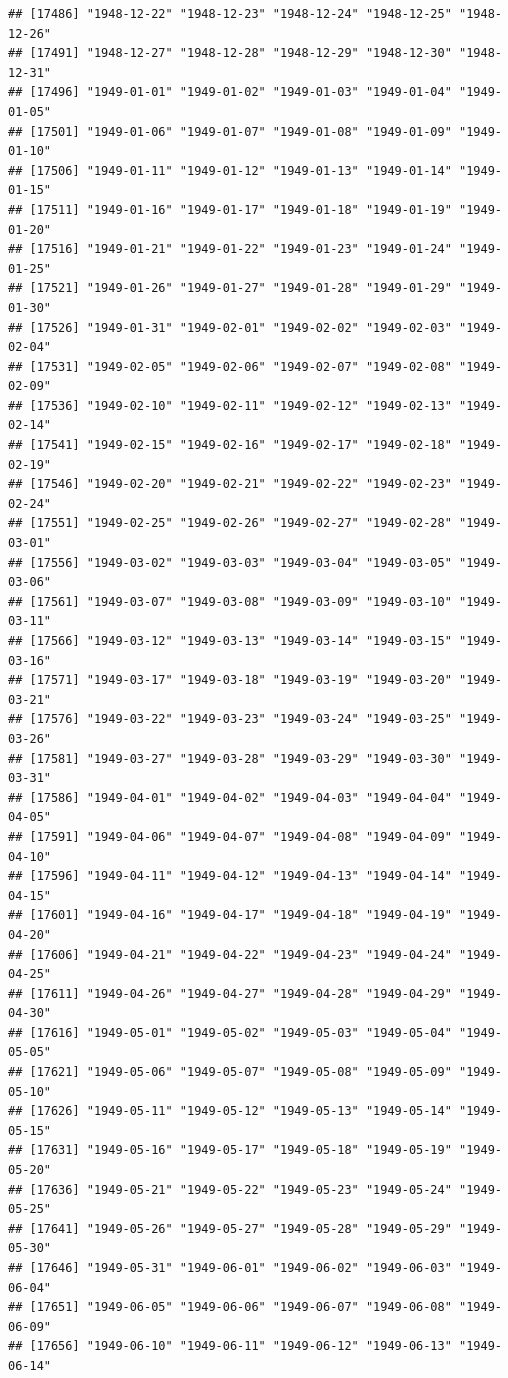 \documentclass{article}\usepackage[]{graphicx}\usepackage[]{color}
\makeatletter
\newenvironment{kframe}{%
 \def\at@end@of@kframe{}%
 \ifinner\ifhmode%
  \def\at@end@of@kframe{\end{minipage}}%
  \begin{minipage}{\columnwidth}%
 \fi\fi%
 \def\FrameCommand##1{\hskip\@totalleftmargin \hskip-\fboxsep
 \colorbox{shadecolor}{##1}\hskip-\fboxsep
     \hskip-\linewidth \hskip-\@totalleftmargin \hskip\columnwidth}%
 \MakeFramed {\advance\hsize-\width
   \@totalleftmargin\z@ \linewidth\hsize
   \@setminipage}}%
 {\par\unskip\endMakeFramed%
 \at@end@of@kframe}
\newenvironment{knitrout}{}{} %
\makeatother
\begin{document}
\begin{description}
\begin{knitrout}
\begin{kframe}
\begin{verbatim}
## [17486] "1948-12-22" "1948-12-23" "1948-12-24" "1948-12-25" "1948-12-26"
## [17491] "1948-12-27" "1948-12-28" "1948-12-29" "1948-12-30" "1948-12-31"
## [17496] "1949-01-01" "1949-01-02" "1949-01-03" "1949-01-04" "1949-01-05"
## [17501] "1949-01-06" "1949-01-07" "1949-01-08" "1949-01-09" "1949-01-10"
## [17506] "1949-01-11" "1949-01-12" "1949-01-13" "1949-01-14" "1949-01-15"
## [17511] "1949-01-16" "1949-01-17" "1949-01-18" "1949-01-19" "1949-01-20"
## [17516] "1949-01-21" "1949-01-22" "1949-01-23" "1949-01-24" "1949-01-25"
## [17521] "1949-01-26" "1949-01-27" "1949-01-28" "1949-01-29" "1949-01-30"
## [17526] "1949-01-31" "1949-02-01" "1949-02-02" "1949-02-03" "1949-02-04"
## [17531] "1949-02-05" "1949-02-06" "1949-02-07" "1949-02-08" "1949-02-09"
## [17536] "1949-02-10" "1949-02-11" "1949-02-12" "1949-02-13" "1949-02-14"
## [17541] "1949-02-15" "1949-02-16" "1949-02-17" "1949-02-18" "1949-02-19"
## [17546] "1949-02-20" "1949-02-21" "1949-02-22" "1949-02-23" "1949-02-24"
## [17551] "1949-02-25" "1949-02-26" "1949-02-27" "1949-02-28" "1949-03-01"
## [17556] "1949-03-02" "1949-03-03" "1949-03-04" "1949-03-05" "1949-03-06"
## [17561] "1949-03-07" "1949-03-08" "1949-03-09" "1949-03-10" "1949-03-11"
## [17566] "1949-03-12" "1949-03-13" "1949-03-14" "1949-03-15" "1949-03-16"
## [17571] "1949-03-17" "1949-03-18" "1949-03-19" "1949-03-20" "1949-03-21"
## [17576] "1949-03-22" "1949-03-23" "1949-03-24" "1949-03-25" "1949-03-26"
## [17581] "1949-03-27" "1949-03-28" "1949-03-29" "1949-03-30" "1949-03-31"
## [17586] "1949-04-01" "1949-04-02" "1949-04-03" "1949-04-04" "1949-04-05"
## [17591] "1949-04-06" "1949-04-07" "1949-04-08" "1949-04-09" "1949-04-10"
## [17596] "1949-04-11" "1949-04-12" "1949-04-13" "1949-04-14" "1949-04-15"
## [17601] "1949-04-16" "1949-04-17" "1949-04-18" "1949-04-19" "1949-04-20"
## [17606] "1949-04-21" "1949-04-22" "1949-04-23" "1949-04-24" "1949-04-25"
## [17611] "1949-04-26" "1949-04-27" "1949-04-28" "1949-04-29" "1949-04-30"
## [17616] "1949-05-01" "1949-05-02" "1949-05-03" "1949-05-04" "1949-05-05"
## [17621] "1949-05-06" "1949-05-07" "1949-05-08" "1949-05-09" "1949-05-10"
## [17626] "1949-05-11" "1949-05-12" "1949-05-13" "1949-05-14" "1949-05-15"
## [17631] "1949-05-16" "1949-05-17" "1949-05-18" "1949-05-19" "1949-05-20"
## [17636] "1949-05-21" "1949-05-22" "1949-05-23" "1949-05-24" "1949-05-25"
## [17641] "1949-05-26" "1949-05-27" "1949-05-28" "1949-05-29" "1949-05-30"
## [17646] "1949-05-31" "1949-06-01" "1949-06-02" "1949-06-03" "1949-06-04"
## [17651] "1949-06-05" "1949-06-06" "1949-06-07" "1949-06-08" "1949-06-09"
## [17656] "1949-06-10" "1949-06-11" "1949-06-12" "1949-06-13" "1949-06-14"

\end{verbatim}
\end{kframe}
\end{knitrout}
\end{description}
\end{document}
